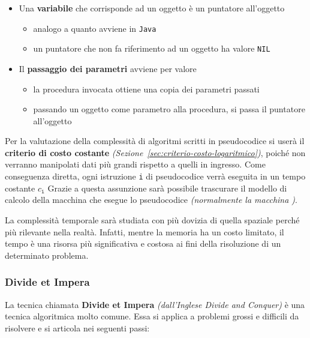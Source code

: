 \documentclass[italian, 10pt]{article}
\begin{document}
\begin{itemize}
\begin{itemize}
\begin{itemize}[label=\(\rightarrow\)]
                \end{itemize}
        \end{itemize}
  \item Una \textbf{variabile} che corrisponde ad un oggetto è un puntatore all'oggetto
        \begin{itemize}
          \item analogo a quanto avviene in \texttt{Java}
          \item un puntatore che non fa riferimento ad un oggetto ha valore \texttt{NIL}
        \end{itemize}
  \item Il \textbf{passaggio dei parametri} avviene per valore
        \begin{itemize}
          \item la procedura invocata ottiene una copia dei parametri passati
          \item passando un oggetto come parametro alla procedura, si passa il puntatore all'oggetto
        \end{itemize}
\end{itemize}

\bigskip
Per la valutazione della complessità di algoritmi scritti in pseudocodice si userà il \textbf{criterio di costo costante} \textit{(Sezione~\ref{sec:criterio-costo-logaritmico})}, poiché non verranno manipolati dati più grandi rispetto a quelli in ingresso.
Come conseguenza diretta, ogni istruzione \texttt{i} di pseudocodice verrà eseguita in un tempo costante \(c_\texttt{i}\)
Grazie a questa assunzione sarà possibile trascurare il modello di calcolo della macchina che esegue lo pseudocodice \textit{(normalmente la macchina \RAM)}.

La complessità temporale sarà studiata con più dovizia di quella spaziale perché più rilevante nella realtà.
Infatti, mentre la memoria ha un costo limitato, il tempo è una risorsa più significativa e costosa ai fini della risoluzione di un determinato problema.

\subsubsection{Divide et Impera}
\label{sec:divide-et-impera}

La tecnica chiamata \textbf{Divide et Impera} \textit{(dall'Inglese Divide and Conquer)} è una tecnica algoritmica molto comune.
Essa si applica a problemi grossi e difficili da risolvere e si articola nei seguenti passi:
\end{document}
